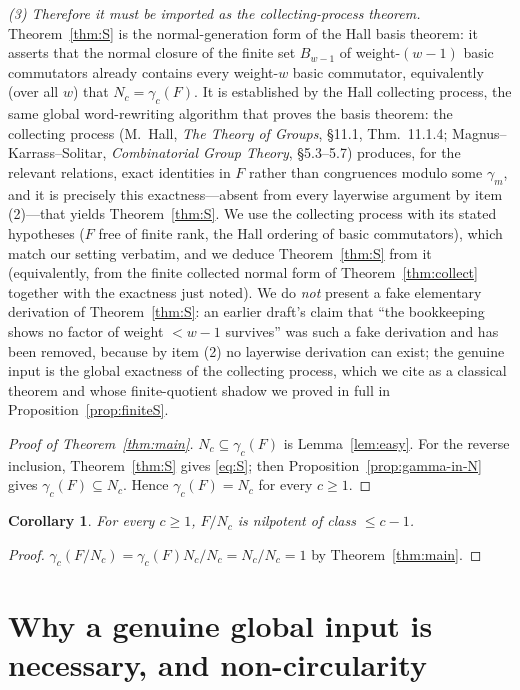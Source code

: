 \documentclass{amsart}
\newtheorem{corollary}{Corollary}
\theoremstyle{definition}
\theoremstyle{remark}
\begin{document}
\emph{(3) Therefore it must be imported as the collecting-process theorem.}
Theorem~\ref{thm:S} is the normal-generation form of the Hall basis theorem: it
asserts that the normal closure of the finite set $B_{w-1}$ of weight-$(w-1)$ basic
commutators already contains every weight-$w$ basic commutator, equivalently (over
all $w$) that $N_c=\gamma_c(F)$. It is established by the Hall collecting process,
the same global word-rewriting algorithm that proves the basis theorem: the
collecting process (M.~Hall, \emph{The Theory of Groups}, \S11.1, Thm.~11.1.4;
Magnus--Karrass--Solitar, \emph{Combinatorial Group Theory}, \S5.3--5.7) produces,
for the relevant relations, exact identities in $F$ rather than congruences modulo
some $\gamma_m$, and it is precisely this exactness---absent from every layerwise
argument by item (2)---that yields Theorem~\ref{thm:S}. We use the collecting
process with its stated hypotheses ($F$ free of finite rank, the Hall ordering of
basic commutators), which match our setting verbatim, and we deduce
Theorem~\ref{thm:S} from it (equivalently, from the finite collected normal form of
Theorem~\ref{thm:collect} together with the exactness just noted). We do \emph{not}
present a fake elementary derivation of Theorem~\ref{thm:S}: an earlier draft's claim
that ``the bookkeeping shows no factor of weight $<w-1$ survives'' was such a fake
derivation and has been removed, because by item (2) no layerwise derivation can
exist; the genuine input is the global exactness of the collecting process, which we
cite as a classical theorem and whose finite-quotient shadow we proved in full in
Proposition~\ref{prop:finiteS}.

\begin{proof}[Proof of Theorem~\ref{thm:main}]
$N_c\subseteq\gamma_c(F)$ is Lemma~\ref{lem:easy}. For the reverse inclusion,
Theorem~\ref{thm:S} gives \eqref{eq:S}; then Proposition~\ref{prop:gamma-in-N}
gives $\gamma_c(F)\subseteq N_c$. Hence $\gamma_c(F)=N_c$ for every $c\ge1$.
\end{proof}

\begin{corollary}
For every $c\ge1$, $F/N_c$ is nilpotent of class $\le c-1$.
\end{corollary}
\begin{proof}
$\gamma_c(F/N_c)=\gamma_c(F)N_c/N_c=N_c/N_c=1$ by Theorem~\ref{thm:main}.
\end{proof}

\section{Why a genuine global input is necessary, and non-circularity}
\label{sec:why}
\end{document}
